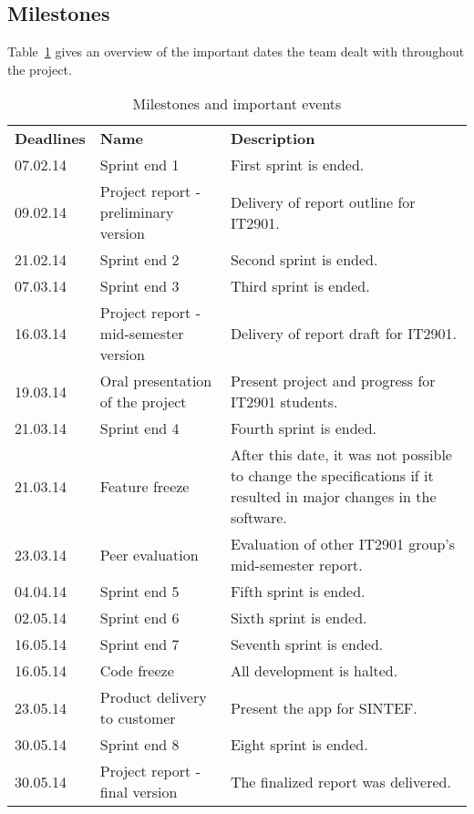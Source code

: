\subsection{Milestones}
Table~\ref{tab:milestones} gives an overview of the important dates the team dealt with throughout the project. 

\begin{table}[H]
\centering
{}
\begin{tabular}{|l|p{6.7cm}|p{6.5cm}|}
\hline
\textbf{Deadlines} & \textbf{Name} & \textbf{Description}\\
07.02.14 & Sprint end 1 & First sprint is ended. \\
09.02.14& Project report - preliminary version & Delivery of report outline for IT2901.\\
21.02.14& Sprint end 2 & Second sprint is ended. \\
07.03.14& Sprint end 3 & Third sprint is ended.\\
16.03.14& Project report - mid-semester version &  Delivery of report draft for IT2901. \\
19.03.14 & Oral presentation of the project & Present project and progress for IT2901 students.\\
21.03.14& Sprint end 4 & Fourth sprint is ended.\\
21.03.14 & Feature freeze & After this date, it was not possible to change the specifications if it resulted in major changes in the software.\\
23.03.14 & Peer evaluation &  Evaluation of other IT2901 group's mid-semester report. \\
04.04.14& Sprint end 5 & Fifth sprint is ended.\\
02.05.14& Sprint end 6 & Sixth sprint is ended.\\
16.05.14& Sprint end 7 & Seventh sprint is ended.\\
16.05.14& Code freeze & All development is halted.\\
23.05.14& Product delivery to customer & Present the app for SINTEF.\\ 
30.05.14& Sprint end 8 & Eight sprint is ended.\\
30.05.14 & Project report - final version & The finalized report was delivered.\\\hline
\end{tabular}
\caption{Milestones and important events}
\label{tab:milestones}
\end{table}
\newpage

